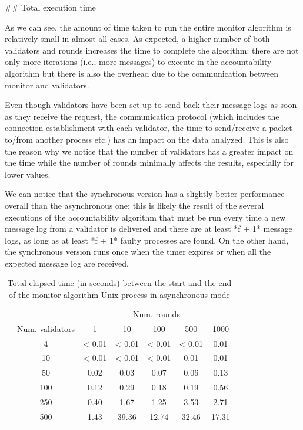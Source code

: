 \documentclass[a4paper,11pt,oneside]{report}
\begin{document}
\begin{markdown}

## Total execution time

As we can see, the amount of time taken to run the entire monitor algorithm is relatively small in almost all cases. 
As expected, a higher number of both validators and rounds increases the time to complete the algorithm: there are not only more iterations (i.e., more messages) to execute in the accountability algorithm but there is also the overhead due to the communication between monitor and validators.

Even though validators have been set up to send back their message logs as soon as they receive the request, the communication protocol (which includes the connection establishment with each validator, the time to send/receive a packet to/from another process etc.) has an impact on the data analyzed. 
This is also the reason why we notice that the number of validators has a greater impact on the time while the number of rounds minimally affects the results, especially for lower values.

We can notice that the synchronous version has a slightly better performance overall than the asynchronous one: this is likely the result of the several executions of the accountability algorithm that must be run every time a new message log from a validator is delivered and there are at least *f + 1* message logs, as long as at least *f + 1* faulty processes are found. 
On the other hand, the synchronous version runs once when the timer expires or when all the expected message log are received.   

\end{markdown}

\begin{table}[]
\centering
\begin{tabular}{l|c|c|c|c|c|c|}
\cline{2-7}
                  &  & \multicolumn{5}{c|}{Num. rounds} \\ \cline{2-7} 
\multirow{7}{*}{} & Num. validators & 1   & 10   & 100  & 500  & 1000  \\ \cline{2-7} 
                  & 4               & < 0.01 & < 0.01  & < 0.01 & < 0.01 &  0.01       \\ \cline{2-7} 
                  & 10              & < 0.01   & < 0.01   & < 0.01  & 0.01  &  0.01     \\ \cline{2-7} 
                  & 50              & 0.02    & 0.03     & 0.07      &  0.06    & 0.13      \\ \cline{2-7} 
                  & 100             & 0.12    & 0.29     & 0.18     & 0.19     &   0.56    \\ \cline{2-7} 
                  & 250             & 0.40    &  1.67    & 1.25     & 3.53      & 2.71      \\ \cline{2-7} 
                  & 500             &  1.43   &  39.36    & 12.74     &  32.46    &  17.31     \\ \cline{2-7} 
\end{tabular}
\caption{Total elapsed time (in seconds) between the start and the end of the monitor algorithm Unix process in asynchronous mode}
\end{table}
\end{document}
